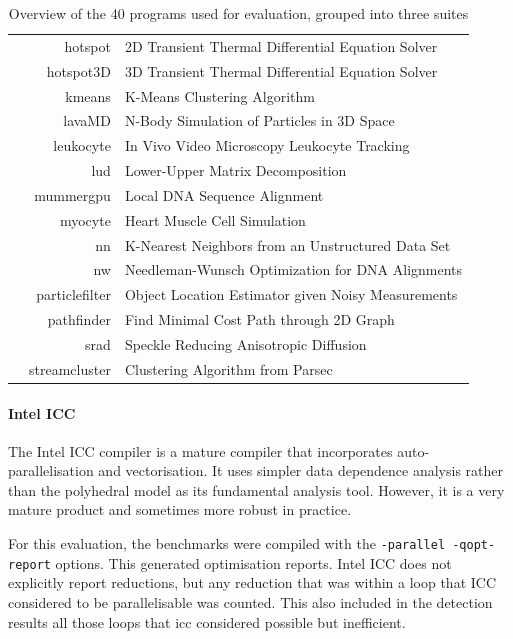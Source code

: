 \begin{table}[H]
\begin{tabular}{|l|r|l|}
 & hotspot        & 2D Transient Thermal Differential Equation Solver\\[-2.4mm]
 & hotspot3D      & 3D Transient Thermal Differential Equation Solver\\[-2.4mm]
 & kmeans         & K-Means Clustering Algorithm\\[-2.4mm]
 & lavaMD         & N-Body Simulation of Particles in 3D Space\\[-2.4mm]
 & leukocyte      & In Vivo Video Microscopy Leukocyte Tracking\\[-2.4mm]
 & lud            & Lower-Upper Matrix Decomposition\\[-2.4mm]
 & mummergpu      & Local DNA Sequence Alignment\\[-2.4mm]
 & myocyte        & Heart Muscle Cell Simulation\\[-2.4mm]
 & nn             & K-Nearest Neighbors from an Unstructured Data Set \\[-2.4mm]
 & nw             & Needleman-Wunsch Optimization for DNA Alignments\\[-2.4mm]
 & particlefilter & Object Location Estimator given Noisy Measurements\\[-2.4mm]
 & pathfinder     & Find Minimal Cost Path through 2D Graph\\[-2.4mm]
 & srad           & Speckle Reducing Anisotropic Diffusion\\[-2.4mm]
 & streamcluster  & Clustering Algorithm from Parsec\\
\hline
\end{tabular}
\caption{Overview of the 40 programs used for evaluation, grouped into three
         suites}
\label{allbenchmarklist}
\end{table}

\paragraph*{Intel ICC}

    The Intel ICC compiler is a mature compiler that incorporates
    auto-parallelisation and vectorisation.
    It uses simpler data dependence analysis rather than the polyhedral model as
    its fundamental analysis tool.
    However, it is a very mature product and sometimes more robust in practice.

    For this evaluation, the benchmarks were compiled with the
    \texttt{-parallel -qopt-report} options.
    This generated optimisation reports.
    Intel ICC does not explicitly report reductions, but any reduction that was
    within a loop that ICC considered to be parallelisable was counted.
    This also included in the detection results all those loops that icc
    considered possible but inefficient.

